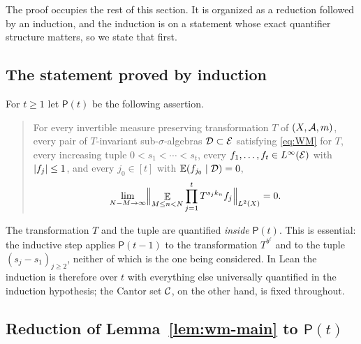 The proof occupies the rest of this section.  It is organized as a reduction followed by an
induction, and the induction is on a statement whose exact quantifier structure matters, so
we state that first.

\subsection*{The statement proved by induction}

For $t \geq 1$ let $\mathsf P(t)$ be the following assertion.
\begin{quote}
  For every invertible measure preserving transformation $T$ of $(X,\mathcal{A},m)$, every pair of
  $T$-invariant sub-$\sigma$-algebras $\mathcal{D} \subset \mathcal{E}$ satisfying \eqref{eq:WM} for $T$,
  every increasing tuple $0 < s_1 < \cdots < s_t$, every $f_1,\dots,f_t \in L^{\infty}(\mathcal{E})$
  with $\lvert f_j \rvert \leq 1$, and every $j_0 \in [t]$ with $\mathbb{E}(f_{j_0} \mid \mathcal{D}) = 0$,
  \begin{equation}
    \label{eq:wm-star}
    \lim_{N-M \to \infty} \Bigl\lVert \mathop{\mathbb{E}}_{M \leq n < N} \prod_{j=1}^{t} T^{s_j k_n} f_j \Bigr\rVert_{L^2(X)} = 0 .
  \end{equation}
\end{quote}
The transformation $T$ and the tuple are quantified \emph{inside} $\mathsf P(t)$.  This is
essential: the inductive step applies $\mathsf P(t-1)$ to the transformation $T^{b^{\ell}}$ and
to the tuple $(s_j - s_1)_{j \geq 2}$, neither of which is the one being considered.  In Lean
the induction is therefore over $t$ with everything else universally quantified in the
induction hypothesis; the Cantor set $\mathcal{C}$, on the other hand, is fixed throughout.

\subsection*{Reduction of Lemma~\ref{lem:wm-main} to $\mathsf P(t)$}

